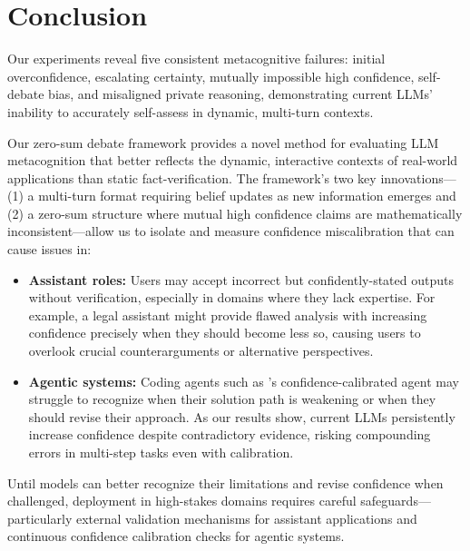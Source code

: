 \documentclass{article}
\begin{document}
\section{Conclusion}

Our experiments reveal five consistent metacognitive failures: initial overconfidence, escalating certainty, mutually impossible high confidence, self-debate bias, and misaligned private reasoning, demonstrating current LLMs' inability to accurately self-assess in dynamic, multi-turn contexts.

Our zero-sum debate framework provides a novel method for evaluating LLM metacognition that better reflects the dynamic, interactive contexts of real-world applications than static fact-verification. The framework's two key innovations— (1) a multi-turn format requiring belief updates as new information emerges and (2) a zero-sum structure where mutual high confidence claims are mathematically inconsistent—allow us to isolate and measure confidence miscalibration that can cause issues in:
\begin{itemize}
    \item \textbf{Assistant roles:} Users may accept incorrect but confidently-stated outputs without verification, especially in domains where they lack expertise. For example, a legal assistant might provide flawed analysis with increasing confidence precisely when they should become less so, causing users to overlook crucial counterarguments or alternative perspectives.
    \item \textbf{Agentic systems:} Coding agents such as \citet{cognitionlabs_devin21_2025}'s confidence-calibrated agent may struggle to recognize when their solution path is weakening or when they should revise their approach. As our results show, current LLMs persistently increase confidence despite contradictory evidence, risking compounding errors in multi-step tasks even with calibration.
\end{itemize}

Until models can better recognize their limitations and revise confidence when challenged, deployment in high-stakes domains requires careful safeguards—particularly external validation mechanisms for assistant applications and continuous confidence calibration checks for agentic systems.

\end{document}
